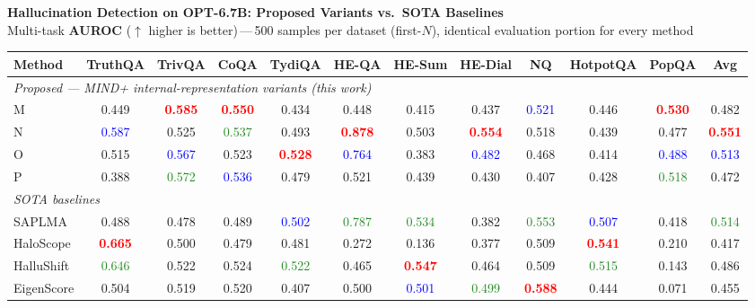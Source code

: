 \documentclass[10pt]{article}
\begin{document}
\pagestyle{empty}
\begin{center}
{\large\bfseries Hallucination Detection on OPT-6.7B: Proposed Variants vs.\ SOTA Baselines}\\[3pt]
{\small Multi-task \textbf{AUROC} ($\uparrow$ higher is better)\,---\,500 samples per dataset (first-$N$), identical evaluation portion for every method}
\end{center}
\vspace{6pt}
\begin{center}
\footnotesize
\begin{tabular}{l *{11}{c}}
\toprule
Method & TruthQA & TrivQA & CoQA & TydiQA & HE-QA & HE-Sum & HE-Dial & NQ & HotpotQA & PopQA & \textbf{Avg} \\
\midrule
\multicolumn{12}{l}{\itshape Proposed --- MIND+ internal-representation variants (this work)}\\
M & 0.449 & \textcolor{red}{\textbf{0.585}} & \textcolor{red}{\textbf{0.550}} & 0.434 & 0.448 & 0.415 & 0.437 & \textcolor{blue}{0.521} & 0.446 & \textcolor{red}{\textbf{0.530}} & 0.482 \\
N & \textcolor{blue}{0.587} & 0.525 & \textcolor{ForestGreen}{0.537} & 0.493 & \textcolor{red}{\textbf{0.878}} & 0.503 & \textcolor{red}{\textbf{0.554}} & 0.518 & 0.439 & 0.477 & \textcolor{red}{\textbf{0.551}} \\
O & 0.515 & \textcolor{blue}{0.567} & 0.523 & \textcolor{red}{\textbf{0.528}} & \textcolor{blue}{0.764} & 0.383 & \textcolor{blue}{0.482} & 0.468 & 0.414 & \textcolor{blue}{0.488} & \textcolor{blue}{0.513} \\
P & 0.388 & \textcolor{ForestGreen}{0.572} & \textcolor{blue}{0.536} & 0.479 & 0.521 & 0.439 & 0.430 & 0.407 & 0.428 & \textcolor{ForestGreen}{0.518} & 0.472 \\
\midrule
\multicolumn{12}{l}{\itshape SOTA baselines}\\
SAPLMA & 0.488 & 0.478 & 0.489 & \textcolor{blue}{0.502} & \textcolor{ForestGreen}{0.787} & \textcolor{ForestGreen}{0.534} & 0.382 & \textcolor{ForestGreen}{0.553} & \textcolor{blue}{0.507} & 0.418 & \textcolor{ForestGreen}{0.514} \\
HaloScope & \textcolor{red}{\textbf{0.665}} & 0.500 & 0.479 & 0.481 & 0.272 & 0.136 & 0.377 & 0.509 & \textcolor{red}{\textbf{0.541}} & 0.210 & 0.417 \\
HalluShift & \textcolor{ForestGreen}{0.646} & 0.522 & 0.524 & \textcolor{ForestGreen}{0.522} & 0.465 & \textcolor{red}{\textbf{0.547}} & 0.464 & 0.509 & \textcolor{ForestGreen}{0.515} & 0.143 & 0.486 \\
EigenScore & 0.504 & 0.519 & 0.520 & 0.407 & 0.500 & \textcolor{blue}{0.501} & \textcolor{ForestGreen}{0.499} & \textcolor{red}{\textbf{0.588}} & 0.444 & 0.071 & 0.455 \\
\bottomrule
\end{tabular}
\end{center}
\end{document}
